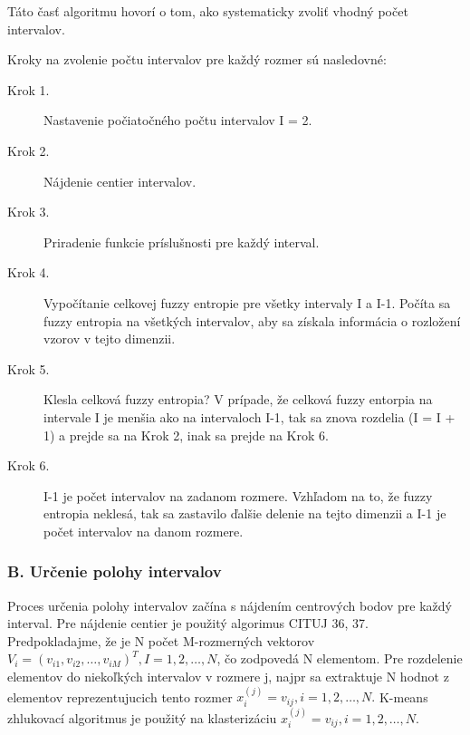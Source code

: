 Táto časť algoritmu hovorí o tom, ako systematicky zvoliť vhodný počet intervalov. 

Kroky na zvolenie počtu intervalov pre každý rozmer sú nasledovné: 
\begin{description}

\item[Krok 1.] Nastavenie počiatočného počtu intervalov I = 2.
\item[Krok 2.] Nájdenie centier intervalov. 
\item[Krok 3.] Priradenie funkcie príslušnosti pre každý interval. 
\item[Krok 4.] Vypočítanie celkovej fuzzy entropie pre všetky intervaly I a I-1. 
Počíta sa fuzzy entropia na všetkých intervalov, aby sa získala informácia o rozložení vzorov v tejto dimenzii.
\item[Krok 5.] Klesla celková fuzzy entropia? 
V prípade, že celková fuzzy entorpia na intervale I je menšia ako na intervaloch I-1, tak sa znova rozdelia (I = I + 1) a prejde sa na Krok 2, inak sa prejde na Krok 6. 
\item[Krok 6.] I-1 je počet intervalov na zadanom rozmere. 
Vzhľadom na to, že fuzzy entropia neklesá, tak sa zastavilo ďalšie delenie na tejto dimenzii a I-1 je počet intervalov na danom rozmere.   
\end{description}

\subsubsection{B. Určenie polohy intervalov}

Proces určenia polohy intervalov začína s nájdením centrových bodov pre každý interval. Pre nájdenie centier je použitý algorimus CITUJ 36, 37. 
Predpokladajme, že je N počet M-rozmerných vektorov $V_i=(v_{i1}, v_{i2},…, v_{iM} )^T, I = 1, 2, \ldots, N$, čo zodpovedá N elementom. Pre rozdelenie elementov do niekoľkých intervalov v rozmere j, najpr sa extraktuje N hodnot z elementov reprezentujucich tento rozmer $x_i^{(j)} = v_{ij}, i=1, 2, \ldots, N.$ K-means zhlukovací algoritmus je použitý na klasterizáciu $x_i^{(j)} = v_{ij}, i=1, 2, \ldots, N.$

